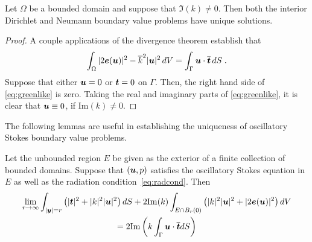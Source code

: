 \begin{thrm}
  Let $\Omega$ be a bounded domain and suppose that
  $\Im (k) \neq 0$. Then both the interior
  Dirichlet and Neumann boundary value problems have
  unique solutions.
\end{thrm}
\begin{proof}
  A couple applications of the divergence theorem establish
  that
  \begin{equation} \label{eq:greenlike}
    \int_\Omega |2{\boldsymbol e}({\boldsymbol u})|^2 - \overline{k}^2 |{\boldsymbol u}|^2 \, dV
    = \int_\Gamma {\boldsymbol u} \cdot \overline{{\boldsymbol t}} \, dS \; . 
  \end{equation}
  Suppose that either ${\boldsymbol u} = 0$ or ${\boldsymbol t} = 0$ on $\Gamma$.
  Then, the right hand side of \cref{eq:greenlike} is
  zero. 
  Taking the real and imaginary parts of \cref{eq:greenlike},
  it is clear that ${\boldsymbol u} \equiv 0$, if $\text{Im}(k) \neq 0$.
\end{proof}

The following lemmas are useful in establishing the uniqueness
of oscillatory Stokes boundary value problems.

\begin{lem}
  \label{lem:rep}
  Let the unbounded region $E$ be given as the exterior
  of a finite collection of bounded domains.
  Suppose that $({\boldsymbol u},p)$ satisfies the oscillatory Stokes equation in 
  $E$ as well as the radiation condition~\cref{eq:radcond}. 
  Then 
  \begin{multline}
    \label{eq:repinfest}  
    \lim_{r\to\infty}
    \int_{|{\boldsymbol y}|=r} \left( |{\boldsymbol t}|^2 + |k|^2 |{\boldsymbol u}|^2 \right) dS +
    2 {\textrm{\textup{Im}}}(k) \int_{E \cap B_{r}(0)} \left(|k|^2 |{\boldsymbol u}|^2 + |2{\boldsymbol e}({\boldsymbol u})|^2 \right)
    dV \\
    = 2 {\textrm{\textup{Im}}} \left( k \int_{\Gamma} {\boldsymbol u} \cdot
\overline{{\boldsymbol t}} dS  \right) 
  \end{multline}
  
\end{lem}

